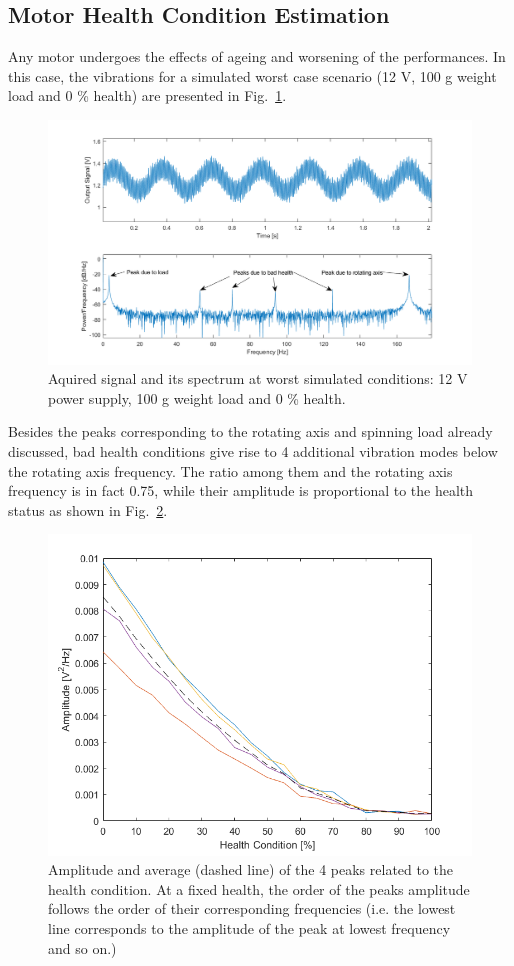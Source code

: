 \documentclass[12pt]{article}
\begin{document}
	\subsection{Motor Health Condition Estimation}
	Any motor undergoes the effects of ageing and worsening of the performances. In this case, the vibrations for a simulated worst case scenario (12 V, 100 g weight load and 0 \% health) are presented in Fig.~\ref{fig:worstcase}. 
	\begin{figure}[h]
		\centering
		\includegraphics[width=0.9\linewidth]{Figures/WorstCase}
		\caption{Aquired signal and its spectrum at worst simulated conditions: 12 V power supply, 100 g weight load and 0 \% health.}
		\label{fig:worstcase}
	\end{figure}
	Besides the peaks corresponding to the rotating axis and spinning load already discussed, bad health conditions give rise to 4 additional vibration modes below the rotating axis frequency. The ratio among them and the rotating axis frequency is in fact 0.75, while their amplitude is proportional to the health status as shown in Fig.~\ref{fig:healthfeature}. 
	\begin{figure}[h!]
		\centering
		\includegraphics[width=0.9\linewidth]{Figures/HealthFeature}
		\caption{Amplitude and average (dashed line) of the 4 peaks related to the health condition. At a fixed health, the order of the peaks amplitude follows the order of their corresponding frequencies (i.e. the lowest line corresponds to the amplitude of the peak at lowest frequency and so on.)}
		\label{fig:healthfeature}
	\end{figure}
\end{document}
